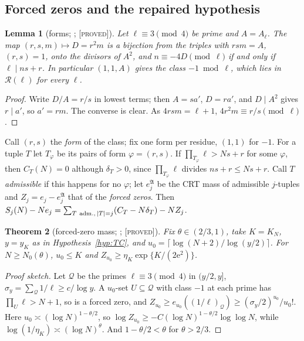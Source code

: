 \documentclass[10pt,reqno]{amsart}
\newtheorem{theorem}{Theorem}[section]
\newtheorem{lemma}[theorem]{Lemma}
\theoremstyle{definition}
\theoremstyle{remark}
\newcommand{\cR}{\mathscr R}
\newcommand{\e}{\mathrm e}
\newcommand{\lab}[1]{\textup{[\textsc{#1}]}}
\begin{document}
\subsection{Forced zeros and the repaired hypothesis}
\begin{lemma}[forms; {\cite[Lemma~1.1, Cor.~1.2]{TU2}}; \lab{proved}]\label{lem:forms}
Let $\ell\equiv3\pmod4$ be prime and $A=A_\ell$.  The map $(r,s,m)\mapsto D=r^2m$ is a
bijection from the triples with $rsm=A$, $(r,s)=1$, onto the divisors of
$A^2$, and $n\equiv-4D\pmod\ell$ if and only if $\ell\mid ns+r$.  In particular
$(1,1,A)$ gives the class $-1\bmod\ell$, which lies in $\cR(\ell)$ for every $\ell$.
\end{lemma}
\begin{proof}
Write $D/A=r/s$ in lowest terms; then $A=sa'$, $D=ra'$, and $D\mid A^2$ gives
$r\mid a'$, so $a'=rm$.  The converse is clear.  As $4rsm=\ell+1$,
$4r^2m\equiv r/s\pmod\ell$.
\end{proof}
Call $(r,s)$ the \emph{form} of the class; fix one form per residue, $(1,1)$
for $-1$.  For a tuple $T$ let $T_\varphi$ be its pairs of form $\varphi=(r,s)$.  If
$\prod_{T_\varphi}\ell>Ns+r$ for some $\varphi$, then $C_T(N)=0$ although $\delta_T>0$, since
$\prod_{T_\varphi}\ell$ divides $ns+r\leq Ns+r$.  Call $T$ \emph{admissible} if this
happens for no $\varphi$; let $e_j^{\mathfrak A}$ be the CRT mass of admissible
$j$-tuples and $Z_j=e_j-e_j^{\mathfrak A}$ that of the \emph{forced zeros}.  Then
$S_j(N)-Ne_j=\sum_{T\ {\rm adm.},\,|T|=j}(C_T-N\delta_T)-NZ_j$.

\begin{theorem}[forced-zero mass; {\cite[Thms~2.1, 2.2]{TU2}}; \lab{proved}]\label{thm:forcedmass}
Fix $\theta\in(2/3,1)$, take $K=K_N$, $y=y_K$ as in Hypothesis~\ref{hyp:TC}, and
$u_0=\lceil\log(N+2)/\log(y/2)\rceil$.  For $N\geq N_0(\theta)$, $u_0\leq K$ and
$Z_{u_0}\geq\eta_K\exp\{K/(2\e^2)\}$.
\end{theorem}
\begin{proof}[Proof sketch]
Let $\mathcal Q$ be the primes $\ell\equiv3\pmod4$ in $(y/2,y]$, $\sigma_y=\sum_{\mathcal Q}1/\ell\geq c/\log y$.
A $u_0$-set $U\subseteq\mathcal Q$ with class $-1$ at each prime has $\prod_U\ell>N+1$, so is
a forced zero, and $Z_{u_0}\geq e_{u_0}((1/\ell)_{\mathcal Q})\geq(\sigma_y/2)^{u_0}/u_0!$.  Here
$u_0\asymp(\log N)^{1-\theta/2}$, so $\log Z_{u_0}\geq-C(\log N)^{1-\theta/2}\log\log N$, while
$\log(1/\eta_K)\asymp(\log N)^\theta$.  And $1-\theta/2<\theta$ for $\theta>2/3$.
\end{proof}
\end{document}
